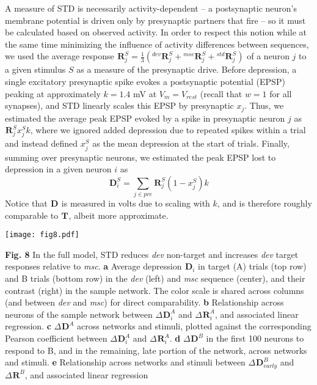 \documentclass[pdflatex,referee,iicol,sn-basic]{sn-jnl}
\newcommand{\dev}{\textit{dev}}
\newcommand{\msc}{\textit{msc}}
\renewcommand{\R}[3][]{{}^{#1}_{}\!\mathbf{R}^{#2}_{#3}}
\renewcommand{\T}[3][]{{}^{#1}_{}\mathbf{T}^{#2}_{#3}}
\newcommand{\D}[3][]{{}^{#1}_{}\!\mathbf{D}^{#2}_{#3}}
\theoremstyle{thmstyleone}%
\theoremstyle{thmstyletwo}%
\theoremstyle{thmstylethree}%
\begin{document}
A measure of STD is necessarily activity-dependent -- a postsynaptic neuron's membrane potential is driven only by presynaptic partners that fire -- so it must be calculated based on observed activity. In order to respect this notion while at the same time minimizing the influence of activity differences between sequences, we used the average response $\R{S}{j} = \frac{1}{3} (\R[dev]{S}{j} + \R[msc]{S}{j} + \R[std]{S}{j})$ of a neuron $j$ to a given stimulus $S$ as a measure of the presynaptic drive. Before depression, a single excitatory presynaptic spike evokes a postsynaptic potential (EPSP) peaking at approximately $k = 1.4$ mV at $V_m = V_{rest}$ (recall that $w = 1$ for all synapses), and STD linearly scales this EPSP by presynaptic $x_j$. Thus, we estimated the average peak EPSP evoked by a spike in presynaptic neuron $j$ as $\R{S}{j} x_j^S k$, where we ignored added depression due to repeated spikes within a trial and instead defined $x_j^S$ as the mean depression at the start of trials. Finally, summing over presynaptic neurons, we estimated the peak EPSP lost to depression in a given neuron $i$ as
\begin{equation}
    \D{S}{i} = \sum_{j \in pre} \R{S}{j} (1-x_j^S) k \label{eqn-D}
\end{equation}
Notice that $\D{}{}$ is measured in volts due to scaling with $k$, and is therefore roughly comparable to $\T{}{}$, albeit more approximate.

\begin{figure*}%
    \centering
    \texttt{[image: fig8.pdf]}
    \caption{}
    \label{fig8}
\end{figure*}
\textbf{Fig. 8} In the full model, STD reduces \dev{} non-target and increases \dev{} target responses relative to \msc{}.
\textbf{a} Average depression $\D{}{i}$ in target (A) trials (top row) and B trials (bottom row) in the \dev{} (left) and \msc{} sequence (center), and their contrast (right) in the sample network. The color scale is shared across columns (and between \dev{} and \msc{}) for direct comparability.
\textbf{b} Relationship across neurons of the sample network between $\Delta \D{A}{i}$ and $\Delta \R{A}{i}$, and associated linear regression.
\textbf{c} $\Delta \D{A}{}$ across networks and stimuli, plotted against the corresponding Pearson coefficient between $\Delta \D{A}{i}$ and $\Delta \R{A}{i}$.
\textbf{d} $\Delta \D{B}{}$ in the first 100 neurons to respond to B, and in the remaining, late portion of the network, across networks and stimuli.
\textbf{e} Relationship across networks and stimuli between $\Delta \D{B}{early}$ and $\Delta \R{B}{}$, and associated linear regression
\end{document}
